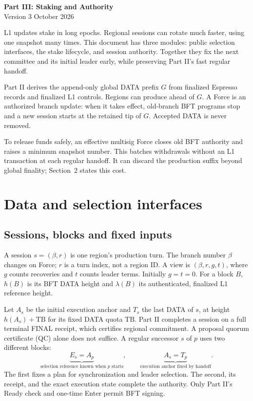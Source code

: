 \documentclass[11pt,a4paper]{article}
\begin{document}
\begin{center}
{\Large\bfseries Part III: Staking and Authority}\\[3pt]
{\small Version 3  October 2026}
\end{center}

L1 updates stake in long epochs. Regional sessions can rotate much faster,
using one snapshot many times. This document has three modules: public
selection interfaces, the stake lifecycle, and session authority. Together
they fix the next committee and its initial leader early, while preserving
Part II's fast regular handoff.

Part II derives the append-only global DATA prefix $G$ from finalized
Espresso records and finalized L1 controls. Regions can produce ahead
of $G$. A Force is an authorized branch update: when it takes effect,
old-branch BFT programs stop and a new session starts at the retained
tip of $G$. Accepted DATA is never removed.

To release funds safely, an effective multisig Force closes old BFT
authority and raises a minimum snapshot number. This batches withdrawals
without an L1 transaction at each regular handoff. It can discard the
production suffix beyond global finality; Section~2 states this cost.

\section{Data and selection interfaces}
\label{sec:data}
\subsection{Sessions, blocks and fixed inputs}
A session $s=(\beta,r)$ is one region's production turn. The branch number
$\beta$ changes on Force; $r$ is a turn index, not a region ID. A view is
$(\beta,r,g,t)$, where $g$ counts recoveries and $t$ counts leader terms.
Initially $g=t=0$. For a block $B$, $h(B)$ is its BFT DATA height and
$\lambda(B)$ its authenticated, finalized L1 reference height.

Let $A_s$ be the initial execution anchor and $T_s$ the last DATA of $s$,
at height $h(A_s)+\mathrm{TB}$ for its fixed DATA quota $\mathrm{TB}$.
Part II completes a session on a full terminal FINAL receipt, which
certifies regional commitment. A proposal quorum certificate (QC) alone
does not suffice. A regular successor $s$ of $p$ uses two different blocks:
\[
 \underbrace{E_s=A_p}_{\text{selection reference known when }p\text{ starts}},
 \qquad
 \underbrace{A_s=T_p}_{\text{execution anchor fixed by handoff}}.
\]
The first fixes a plan for synchronization and leader selection. The
second, its receipt, and the exact execution state complete the authority.
Only Part II's Ready check and one-time Enter permit BFT signing.
\end{document}
